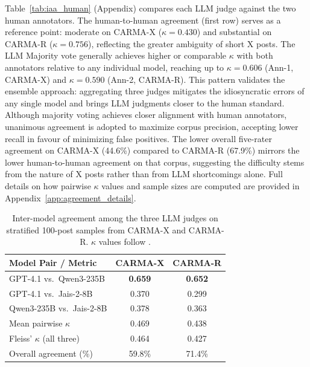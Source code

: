 \documentclass[11pt]{article}
\begin{document}
Table~\ref{tab:iaa_human} (Appendix) compares each LLM judge against the two human
annotators. The human-to-human agreement (first row) serves as a
reference point: moderate on CARMA-X ($\kappa = 0.430$) and substantial
on CARMA-R ($\kappa = 0.756$), reflecting the greater ambiguity of short
X posts. The LLM Majority vote generally achieves higher or comparable
$\kappa$ with both annotators relative to any individual model, reaching
up to $\kappa = 0.606$ (Ann-1, CARMA-X) and $\kappa = 0.590$ (Ann-2,
CARMA-R). This pattern validates the ensemble approach: aggregating
three judges mitigates the idiosyncratic errors of any single model and
brings LLM judgments closer to the human standard. Although majority
voting achieves closer alignment with human annotators, unanimous
agreement is adopted to maximize corpus precision, accepting lower
recall in favour of minimizing false positives. The lower overall
five-rater agreement on CARMA-X (44.6\%) compared to CARMA-R (67.9\%)
mirrors the lower human-to-human agreement on that corpus, suggesting
the difficulty stems from the nature of X posts rather than from LLM
shortcomings alone. Full details on how pairwise $\kappa$ values and
sample sizes are computed are provided in
Appendix~\ref{app:agreement_details}.

\begin{table}[h]
\centering
\small
\begin{tabular}{lcc}
\toprule
\textbf{Model Pair / Metric} & \textbf{CARMA-X} & \textbf{CARMA-R} \\
\midrule
GPT-4.1 vs.\ Qwen3-235B       & \textbf{0.659} & \textbf{0.652} \\
GPT-4.1 vs.\ Jais-2-8B        & 0.370          & 0.299          \\
Qwen3-235B vs.\ Jais-2-8B     & 0.378          & 0.363          \\
\midrule
Mean pairwise $\kappa$         & 0.469          & 0.438          \\
Fleiss' $\kappa$ (all three)   & 0.464          & 0.427          \\
\midrule
Overall agreement (\%)         & 59.8\%         & 71.4\%         \\
\bottomrule
\end{tabular}
\caption{Inter-model agreement among the three LLM judges on
stratified 100-post samples from CARMA-X and CARMA-R.
$\kappa$ values follow \citet{landis1977measurement}.}
\label{tab:iaa}
\end{table}

\end{document}
